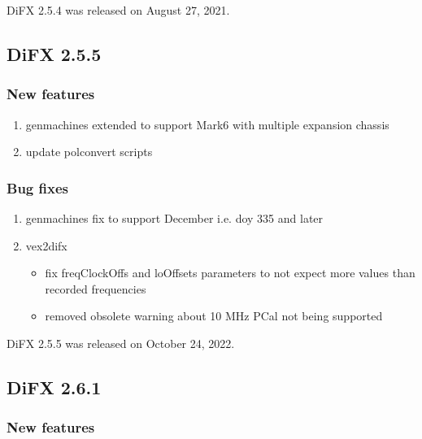 DiFX 2.5.4 was released on August 27, 2021.


\subsection{DiFX 2.5.5}

\subsubsection{New features}

\begin{enumerate}
\item genmachines extended to support Mark6 with multiple expansion chassis
\item update polconvert scripts
\end{enumerate}

\subsubsection{Bug fixes}

\begin{enumerate}
\item genmachines fix to support December i.e. doy 335 and later
\item vex2difx
\begin{itemize}
  \item fix freqClockOffs and loOffsets parameters to not expect more values than recorded frequencies
  \item removed obsolete warning about 10 MHz PCal not being supported
\end{itemize}
\end{enumerate}

DiFX 2.5.5 was released on October 24, 2022.

\subsection{DiFX 2.6.1}

\subsubsection{New features}


